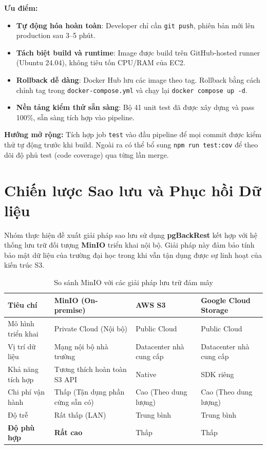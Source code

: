 \textbf{Ưu điểm:}
\begin{itemize}
  \item \textbf{Tự động hóa hoàn toàn}: Developer chỉ cần \texttt{git push},
        phiên bản mới lên production sau 3--5 phút.
  \item \textbf{Tách biệt build và runtime}: Image được build trên
        GitHub-hosted runner (Ubuntu 24.04), không tiêu tốn CPU/RAM của EC2.
  \item \textbf{Rollback dễ dàng}: Docker Hub lưu các image theo tag.
        Rollback bằng cách chỉnh tag trong \texttt{docker-compose.yml}
        và chạy lại \texttt{docker compose up -d}.
  \item \textbf{Nền tảng kiểm thử sẵn sàng}: Bộ 41 unit test đã được
        xây dựng và pass 100\%, sẵn sàng tích hợp vào pipeline.
\end{itemize}

\textbf{Hướng mở rộng:}
Tích hợp job \texttt{test} vào đầu pipeline để mọi commit được kiểm thử
tự động trước khi build. Ngoài ra có thể bổ sung \texttt{npm run test:cov}
để theo dõi độ phủ test (code coverage) qua từng lần merge.

\chapter{Chiến lược Sao lưu và Phục hồi Dữ liệu}
\label{ch:backup_strategy}

Nhóm thực hiện đề xuất giải pháp sao lưu sử dụng \textbf{pgBackRest} kết hợp với hệ thống lưu trữ đối tượng \textbf{MinIO} triển khai nội bộ. Giải pháp này đảm bảo tính bảo mật dữ liệu của trường đại học trong khi vẫn tận dụng được sự linh hoạt của kiến trúc S3.

\begin{table}[H]
\centering
\caption{So sánh MinIO với các giải pháp lưu trữ đám mây}
\label{tab:backup_comparison}
\begin{tabular}{|p{3cm}|p{3.5cm}|p{3cm}|p{3cm}|}
\hline
\textbf{Tiêu chí} & \textbf{MinIO (On-premise)} & \textbf{AWS S3} & \textbf{Google Cloud Storage} \\
\hline
Mô hình triển khai & Private Cloud (Nội bộ) & Public Cloud & Public Cloud \\
\hline
Vị trí dữ liệu & Mạng nội bộ nhà trường & Datacenter nhà cung cấp & Datacenter nhà cung cấp \\
\hline
Khả năng tích hợp & Tương thích hoàn toàn S3 API & Native & SDK riêng \\
\hline
Chi phí vận hành & Thấp (Tận dụng phần cứng sẵn có) & Cao (Theo dung lượng) & Cao (Theo dung lượng) \\
\hline
Độ trễ & Rất thấp (LAN) & Trung bình & Trung bình \\
\hline
\textbf{Độ phù hợp} & \textbf{Rất cao} & Thấp & Thấp \\
\hline
\end{tabular}
\end{table}

